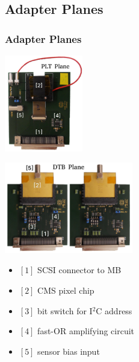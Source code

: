 \documentclass[9pt]{beamer}
\begin{document}
\subsection{Adapter Planes}
\begin{frame}
	\frametitle{Adapter Planes}
	\begin{center}
		\begin{minipage}{4cm}
			\centering
			\includegraphics[width=3.4cm]{Pics/AdapterAnalog}
		\end{minipage}
		\hspace*{2pt}
		\begin{minipage}{7cm}
			\centering
			\includegraphics[width=5.6cm]{Pics/AdapterDigital}
		\end{minipage}
	\end{center}
	\begin{center}
		\begin{minipage}{5.5cm}
			\begin{itemize}
				\item $[1]$ SCSI connector to MB
				\item $[2]$ CMS pixel chip
				\item $[3]$ bit switch for I$^{2}$C address
			\end{itemize}
		\end{minipage}
		\hspace*{2pt}
		\begin{minipage}{5.5cm}
			\begin{itemize}
				\item $[4]$ fast-OR amplifying circuit
				\item $[5]$ sensor bias input
			\end{itemize}
		\end{minipage}
	\end{center}
\end{frame}
\end{document}
